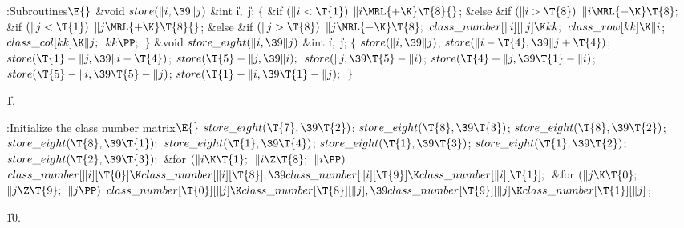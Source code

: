 \Y\B\4:Subroutines\X${}\E{}$\6
\&{void} ${}\\{store}(\|i,\39\|j){}$\1\1\6
\&{int} \|i${},{}$ \|j;\2\2\6
${}\{{}$\1\6
\&{if} ${}(\|i<\T{1}){}$\1\5
${}\|i\MRL{+{\K}}\T{8}{}$;\5
\2\&{else} \&{if} ${}(\|i>\T{8}){}$\1\5
${}\|i\MRL{-{\K}}\T{8};{}$\2\6
\&{if} ${}(\|j<\T{1}){}$\1\5
${}\|j\MRL{+{\K}}\T{8}{}$;\5
\2\&{else} \&{if} ${}(\|j>\T{8}){}$\1\5
${}\|j\MRL{-{\K}}\T{8};{}$\2\6
${}\\{class\_number}[\|i][\|j]\K\\{kk};{}$\6
${}\\{class\_row}[\\{kk}]\K\|i{}$;\5
${}\\{class\_col}[\\{kk}]\K\|j;{}$\6
${}\\{kk}\PP;{}$\6
\4${}\}{}$\2\7
\&{void} ${}\\{store\_eight}(\|i,\39\|j){}$\1\1\6
\&{int} \|i${},{}$ \|j;\2\2\6
${}\{{}$\1\6
${}\\{store}(\|i,\39\|j){}$;\5
${}\\{store}(\|i-\T{4},\39\|j+\T{4}){}$;\5
${}\\{store}(\T{1}-\|j,\39\|i-\T{4}){}$;\5
${}\\{store}(\T{5}-\|j,\39\|i);{}$\6
${}\\{store}(\|j,\39\T{5}-\|i){}$;\5
${}\\{store}(\T{4}+\|j,\39\T{1}-\|i){}$;\5
${}\\{store}(\T{5}-\|i,\39\T{5}-\|j){}$;\5
${}\\{store}(\T{1}-\|i,\39\T{1}-\|j);{}$\6
\4${}\}{}$\2\par
\U1.\fi

\B{}:Initialize the class number matrix\X${}\E{}$\6
$\\{store\_eight}(\T{7},\39\T{2}){}$;\5
${}\\{store\_eight}(\T{8},\39\T{3}){}$;\5
${}\\{store\_eight}(\T{8},\39\T{2}){}$;\5
${}\\{store\_eight}(\T{8},\39\T{1});{}$\6
${}\\{store\_eight}(\T{1},\39\T{4}){}$;\5
${}\\{store\_eight}(\T{1},\39\T{3}){}$;\5
${}\\{store\_eight}(\T{1},\39\T{2}){}$;\5
${}\\{store\_eight}(\T{2},\39\T{3});{}$\6
\&{for} ${}(\|i\K\T{1};{}$ ${}\|i\Z\T{8};{}$ ${}\|i\PP){}$\1\5
${}\\{class\_number}[\|i][\T{0}]\K\\{class\_number}[\|i][\T{8}],\39\\{class%
\_number}[\|i][\T{9}]\K\\{class\_number}[\|i][\T{1}];{}$\2\6
\&{for} ${}(\|j\K\T{0};{}$ ${}\|j\Z\T{9};{}$ ${}\|j\PP){}$\1\5
${}\\{class\_number}[\T{0}][\|j]\K\\{class\_number}[\T{8}][\|j],\39\\{class%
\_number}[\T{9}][\|j]\K\\{class\_number}[\T{1}][\|j]{}$;\2\par
\U10.\fi

